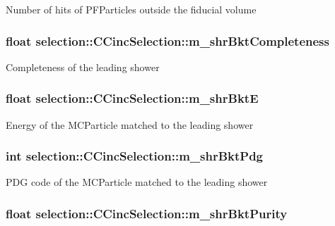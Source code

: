 Number of hits of P\-F\-Particles outside the fiducial volume \hypertarget{classselection_1_1CCincSelection_ae50845633aef1725ac8c894101041f54}{
\subsubsection[{m\-\_\-shr\-Bkt\-Completeness}]{\setlength{\rightskip}{0pt plus 5cm}float selection\-::\-C\-Cinc\-Selection\-::m\-\_\-shr\-Bkt\-Completeness\hspace{0.3cm}{\ttfamily [private]}}}\label{classselection_1_1CCincSelection_ae50845633aef1725ac8c894101041f54}
Completeness of the leading shower \hypertarget{classselection_1_1CCincSelection_a0a43f7b976987cc6d13389a589c561e2}{
\subsubsection[{m\-\_\-shr\-Bkt\-E}]{\setlength{\rightskip}{0pt plus 5cm}float selection\-::\-C\-Cinc\-Selection\-::m\-\_\-shr\-Bkt\-E\hspace{0.3cm}{\ttfamily [private]}}}\label{classselection_1_1CCincSelection_a0a43f7b976987cc6d13389a589c561e2}
Energy of the M\-C\-Particle matched to the leading shower \hypertarget{classselection_1_1CCincSelection_aa11fee829a174ef4b6f92041edb990cf}{
\subsubsection[{m\-\_\-shr\-Bkt\-Pdg}]{\setlength{\rightskip}{0pt plus 5cm}int selection\-::\-C\-Cinc\-Selection\-::m\-\_\-shr\-Bkt\-Pdg\hspace{0.3cm}{\ttfamily [private]}}}\label{classselection_1_1CCincSelection_aa11fee829a174ef4b6f92041edb990cf}
P\-D\-G code of the M\-C\-Particle matched to the leading shower \hypertarget{classselection_1_1CCincSelection_a95079e8ae0cb7d55594d64812d24327c}{
\subsubsection[{m\-\_\-shr\-Bkt\-Purity}]{\setlength{\rightskip}{0pt plus 5cm}float selection\-::\-C\-Cinc\-Selection\-::m\-\_\-shr\-Bkt\-Purity\hspace{0.3cm}{\ttfamily [private]}}}\label{classselection_1_1CCincSelection_a95079e8ae0cb7d55594d64812d24327c}
